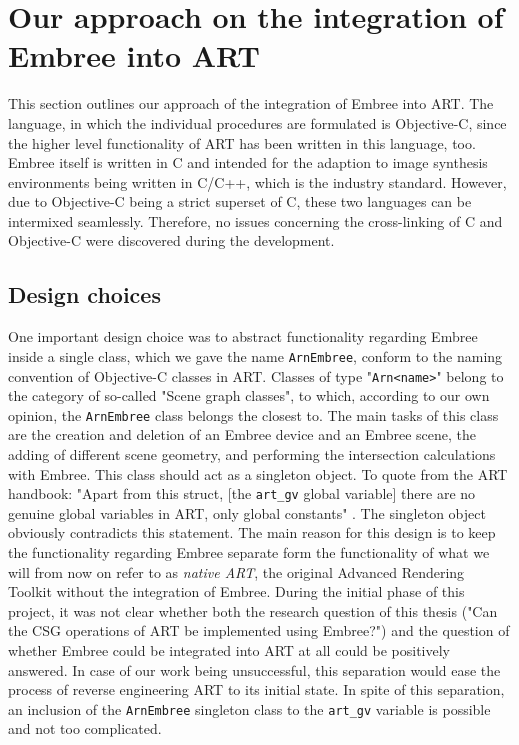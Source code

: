 \chapter{Our approach on the integration of Embree into ART}
\label{chap:math}

This section outlines our approach of the integration of Embree into ART. The language, in which the individual procedures are formulated is Objective-C, since the higher level functionality of ART has been written in this language, too. Embree itself is written in C and intended for the adaption to image synthesis environments being written in C/C++, which is the industry standard. However, due to Objective-C being a strict superset of C, these two languages can be intermixed seamlessly. Therefore, no issues concerning the cross-linking of C and Objective-C were discovered during the development.

\section{Design choices}

One important design choice was to abstract functionality regarding Embree inside a single class, which we gave the name \texttt{ArnEmbree}, conform to the naming convention of Objective-C classes in ART. Classes of type "\texttt{Arn<name>}" belong to the category of so-called "Scene graph classes", to which, according to our own opinion, the \texttt{ArnEmbree} class belongs the closest to. The main tasks of this class are the creation and deletion of an Embree device and an Embree scene, the adding of different scene geometry, and performing the intersection calculations with Embree. This class should act as a singleton object. To quote from the ART handbook: "Apart from this struct, [the \texttt{art\_gv} global variable] there are no genuine global variables in ART, only global constants" \cite[Chapter 4.1.2]{arthandbook}. The singleton object obviously contradicts this statement. The main reason for this design is to keep the functionality regarding Embree separate form the functionality of what we will from now on refer to as \emph{native ART}, the original Advanced Rendering Toolkit without the integration of Embree. During the initial phase of this project, it was not clear whether both the research question of this thesis ("Can the CSG operations of ART be implemented using Embree?") and the question of whether Embree could be integrated into ART at all could be positively answered. In case of our work being unsuccessful, this separation would ease the process of reverse engineering ART to its initial state.
In spite of this separation, an inclusion of the \texttt{ArnEmbree} singleton class to the \texttt{art\_gv} variable is possible and not too complicated.

